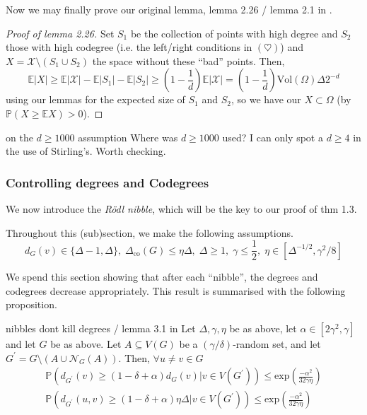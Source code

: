 \documentclass{article}
\begin{document}
Now we may finally prove our original lemma, lemma 2.26 / lemma 2.1 in \cite{campos2023}. 

\begin{proof}[Proof of lemma 2.26]
    Set $S_1$ be the collection of points with high degree and $S_2$ those with high codegree (i.e. the left/right 
    conditions in $(\heartsuit)$) and $X = \mathcal{X} \setminus (S_1 \cup S_2)$ the space without these ``bad'' points.
    Then,
    \[\mathbb{E}|X| \geq \mathbb{E}|\mathcal{X}| - \mathbb{E}|S_1| - \mathbb{E}|S_2| 
    \geq \left(1 - \frac{1}{d}\right)\mathbb{E}|\mathcal{X}| = \left(1 - \frac{1}{d}\right)\text{Vol}(\Omega)\Delta 2^{-d}\]
    using our lemmas for the expected size of $S_1$ and $S_2$, so we have our $X \subset \Omega$ (by $\mathbb{P}(X \geq \mathbb{E}X) > 0$).
\end{proof}

\begin{remark}[]{on the $d \geq 1000$ assumption}
    Where was $d \geq 1000$ used? I can only spot a $d \geq 4$ in the use of Stirling's. Worth checking.
\end{remark}

\subsubsection*{Controlling degrees and Codegrees}

We now introduce the {\it R\"{o}dl nibble}, which will be the key to our proof of thm 1.3. 

Throughout this (sub)section, we make the following assumptions. 
\[d_G(v) \in \{\Delta -1, \Delta\}, \; \Delta_{\text{co}}(G) \leq \eta \Delta, \; \Delta \geq 1, \; 
\gamma \leq \frac{1}{2}, \; \eta \in [\Delta^{-1/2}, \gamma^2/8]\]

We spend this section showing that after each ``nibble'', the degrees and codegrees decrease appropriately. This 
result is summarised with the following proposition. 

\begin{proposition}[]{nibbles dont kill degrees / lemma 3.1 in \cite{campos2023}}
    Let $\Delta, \gamma, \eta$ be as above, let $\alpha \in [2\gamma^2, \gamma]$ and let $G$ be as above. Let 
    $A \subseteq V(G)$ be a $(\gamma/\delta)$-random set, and let $G^\prime = G \setminus (A \cup \mathcal{N}_G(A))$.
    Then, $\forall u \neq v \in G$ 
    \begin{align*}
        \mathbb{P}(d_{G^\prime}(v) \geq (1 - \delta + \alpha)d_G(v) | v \in V(G^\prime)) \leq \text{exp}\left(\frac{-\alpha^2}{32\gamma\eta}\right) \\
        \mathbb{P}(d_{G^\prime}(u,v) \geq (1 - \delta + \alpha)\eta\Delta | v \in V(G^\prime)) \leq \text{exp}\left(\frac{-\alpha^2}{32\gamma\eta}\right)
    \end{align*}
\end{proposition}
\end{document}
